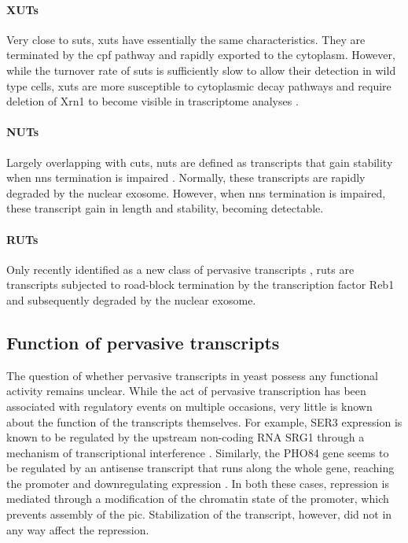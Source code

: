 \paragraph{XUTs}

Very close to \gls{suts}, \gls{xuts} have essentially the same characteristics.
They are terminated by the \gls{cpf} pathway and rapidly exported to the cytoplasm.
However, while the turnover rate of \gls{suts} is sufficiently slow to allow their detection in wild type cells, \gls{xuts} are more susceptible to cytoplasmic decay pathways and require deletion of Xrn1 to become visible in trascriptome analyses \cite{vandijk:2011:xuts}.
  
\paragraph{NUTs}

Largely overlapping with \gls{cuts}, \gls{nuts} are defined as transcripts that gain stability when \gls{nns} termination is impaired \cite{schulz:2013:transcriptome}.
Normally, these transcripts are rapidly degraded by the nuclear exosome.
However, when \gls{nns} termination is impaired, these transcript gain in length and stability, becoming detectable.


\paragraph{RUTs}

Only recently identified as a new class of pervasive transcripts \cite{colin:2014:roadblock}, \gls{ruts} are transcripts subjected to road-block termination by the transcription factor Reb1 and subsequently degraded by the nuclear exosome.

\subsection{Function of pervasive transcripts}

The question of whether pervasive transcripts in yeast possess any functional activity remains unclear.
While the act of pervasive transcription has been associated with regulatory events on multiple occasions, very little is known about the function of the transcripts themselves.
For example, SER3 expression is known to be  regulated by the upstream non-coding RNA SRG1 through a mechanism of transcriptional interference \cite{martens:2004:intergenic}.  
Similarly, the PHO84 gene seems to be regulated by an antisense transcript that runs along the whole gene, reaching the promoter and downregulating expression \cite{castelnuovo:2013:bimodal}.
In both these cases, repression is mediated through a modification of the chromatin state of the promoter, which prevents assembly of the \acrlong{pic}.
Stabilization of the transcript, however, did not in any way affect the repression.

